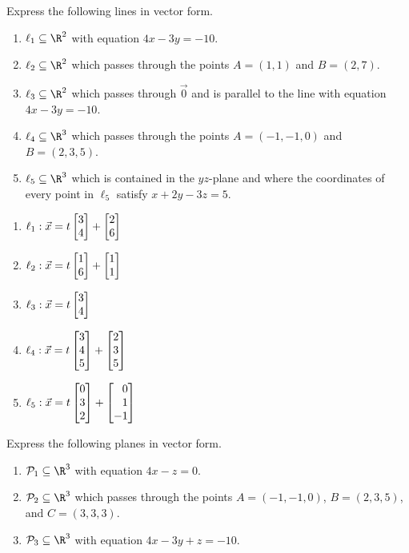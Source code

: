 \begin{exercises}
	\begin{problist}
		\prob  Express the following lines in vector form.
		\begin{enumerate}
			\item   $\ell_1\subseteq\R^2$ with equation $4x-3y=-10$.
			\item   $\ell_2\subseteq\R^2$ which passes through the points $A=(1,1)$ and $B=(2,7)$.
			\item   $\ell_3\subseteq\R^2$ which passes through $\vec 0$ and is parallel to the line
				with equation $4x-3y=-10$.
			\item   $\ell_4\subseteq\R^3$ which passes through the points $A=(-1,-1,0)$ and $B=(2,3,5)$.
			\item   $\ell_5\subseteq\R^3$ which is contained in the $yz$-plane and where the coordinates
				of every point in $\ell_5$ satisfy $x+2y-3z=5$.
		\end{enumerate}
		\begin{solution}
			\begin{enumerate}
				\item $\ell_1: \vec{x}=t\mat{3\\4}+\mat{2\\6}$
				\item $\ell_2: \vec{x}=t\mat{1\\6}+\mat{1\\1}$
				\item $\ell_3: \vec{x}=t\mat{3\\4}$
				\item $\ell_4: \vec{x}=t\mat{3\\4\\5}+\mat{2\\3\\5}$
				\item $\ell_5: \vec{x}=t\mat{0\\3\\2}+\mat{0\\1\\-1}$
			\end{enumerate}
		\end{solution}
		\prob Express the following planes in vector form.
		\begin{enumerate}
			\item   $\mathcal P_1\subseteq\R^3$ with equation $4x-z=0$.
			\item   $\mathcal P_2\subseteq\R^3$ which passes through the points $A=(-1,-1,0)$, $B=(2,3,5)$, and $C=(3,3,3)$.
			\item   $\mathcal P_3\subseteq\R^3$ with equation $4x-3y+z=-10$.

\end{enumerate}
\end{problist}
\end{exercises}
